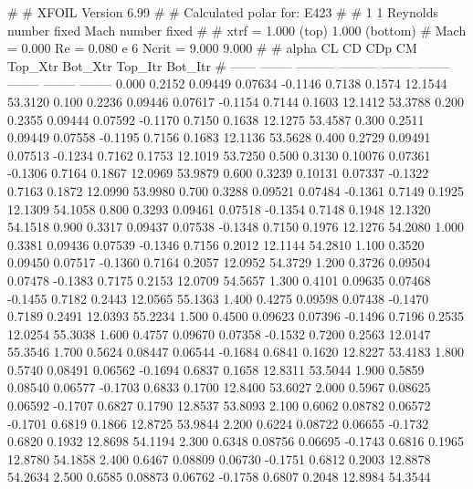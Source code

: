 #  
#       XFOIL         Version 6.99
#  
# Calculated polar for: E423                                            
#  
# 1 1 Reynolds number fixed          Mach number fixed         
#  
# xtrf =   1.000 (top)        1.000 (bottom)  
# Mach =   0.000     Re =     0.080 e 6     Ncrit =   9.000  9.000
#  
#   alpha    CL        CD       CDp       CM     Top_Xtr  Bot_Xtr  Top_Itr  Bot_Itr
#  ------ -------- --------- --------- -------- -------- -------- -------- --------
   0.000   0.2152   0.09449   0.07634  -0.1146   0.7138   0.1574  12.1544  53.3120
   0.100   0.2236   0.09446   0.07617  -0.1154   0.7144   0.1603  12.1412  53.3788
   0.200   0.2355   0.09444   0.07592  -0.1170   0.7150   0.1638  12.1275  53.4587
   0.300   0.2511   0.09449   0.07558  -0.1195   0.7156   0.1683  12.1136  53.5628
   0.400   0.2729   0.09491   0.07513  -0.1234   0.7162   0.1753  12.1019  53.7250
   0.500   0.3130   0.10076   0.07361  -0.1306   0.7164   0.1867  12.0969  53.9879
   0.600   0.3239   0.10131   0.07337  -0.1322   0.7163   0.1872  12.0990  53.9980
   0.700   0.3288   0.09521   0.07484  -0.1361   0.7149   0.1925  12.1309  54.1058
   0.800   0.3293   0.09461   0.07518  -0.1354   0.7148   0.1948  12.1320  54.1518
   0.900   0.3317   0.09437   0.07538  -0.1348   0.7150   0.1976  12.1276  54.2080
   1.000   0.3381   0.09436   0.07539  -0.1346   0.7156   0.2012  12.1144  54.2810
   1.100   0.3520   0.09450   0.07517  -0.1360   0.7164   0.2057  12.0952  54.3729
   1.200   0.3726   0.09504   0.07478  -0.1383   0.7175   0.2153  12.0709  54.5657
   1.300   0.4101   0.09635   0.07468  -0.1455   0.7182   0.2443  12.0565  55.1363
   1.400   0.4275   0.09598   0.07438  -0.1470   0.7189   0.2491  12.0393  55.2234
   1.500   0.4500   0.09623   0.07396  -0.1496   0.7196   0.2535  12.0254  55.3038
   1.600   0.4757   0.09670   0.07358  -0.1532   0.7200   0.2563  12.0147  55.3546
   1.700   0.5624   0.08447   0.06544  -0.1684   0.6841   0.1620  12.8227  53.4183
   1.800   0.5740   0.08491   0.06562  -0.1694   0.6837   0.1658  12.8311  53.5044
   1.900   0.5859   0.08540   0.06577  -0.1703   0.6833   0.1700  12.8400  53.6027
   2.000   0.5967   0.08625   0.06592  -0.1707   0.6827   0.1790  12.8537  53.8093
   2.100   0.6062   0.08782   0.06572  -0.1701   0.6819   0.1866  12.8725  53.9844
   2.200   0.6224   0.08722   0.06655  -0.1732   0.6820   0.1932  12.8698  54.1194
   2.300   0.6348   0.08756   0.06695  -0.1743   0.6816   0.1965  12.8780  54.1858
   2.400   0.6467   0.08809   0.06730  -0.1751   0.6812   0.2003  12.8878  54.2634
   2.500   0.6585   0.08873   0.06762  -0.1758   0.6807   0.2048  12.8984  54.3544
